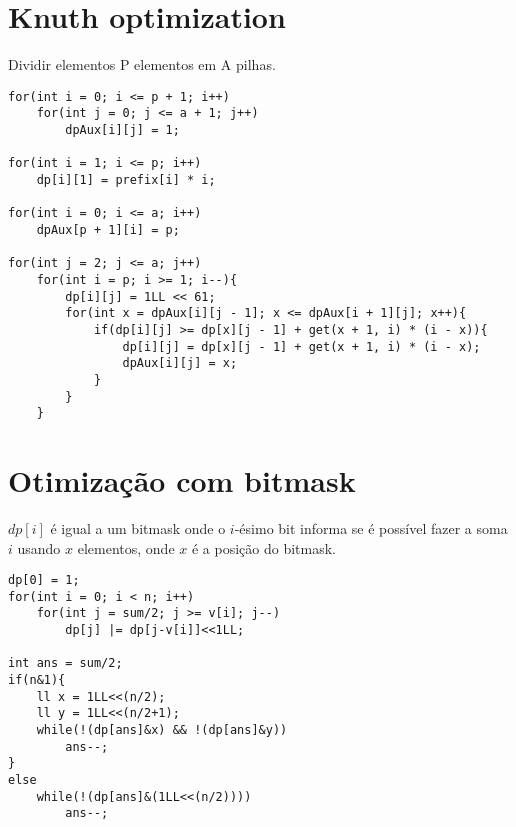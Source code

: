 \section{Knuth optimization}

Dividir elementos P elementos em A pilhas.

\begin{multicols}{2}
\begin{lstlisting}
for(int i = 0; i <= p + 1; i++)
	for(int j = 0; j <= a + 1; j++)
		dpAux[i][j] = 1;
	
for(int i = 1; i <= p; i++)
	dp[i][1] = prefix[i] * i;

for(int i = 0; i <= a; i++)
	dpAux[p + 1][i] = p;

for(int j = 2; j <= a; j++)
	for(int i = p; i >= 1; i--){
		dp[i][j] = 1LL << 61;
		for(int x = dpAux[i][j - 1]; x <= dpAux[i + 1][j]; x++){
			if(dp[i][j] >= dp[x][j - 1] + get(x + 1, i) * (i - x)){
				dp[i][j] = dp[x][j - 1] + get(x + 1, i) * (i - x);
				dpAux[i][j] = x;					
			}
		}
	}

\end{lstlisting}
\end{multicols}

\section{Otimização com bitmask}

$dp[i]$ é igual a um bitmask onde o $i$-ésimo bit informa se é possível fazer a soma $i$ usando $x$ elementos, onde $x$ é a posição do bitmask.

\begin{multicols}{2}
\begin{lstlisting}
dp[0] = 1;
for(int i = 0; i < n; i++)
	for(int j = sum/2; j >= v[i]; j--)
		dp[j] |= dp[j-v[i]]<<1LL;

int ans = sum/2;
if(n&1){
	ll x = 1LL<<(n/2);
	ll y = 1LL<<(n/2+1);
	while(!(dp[ans]&x) && !(dp[ans]&y))
		ans--;
}
else
	while(!(dp[ans]&(1LL<<(n/2))))	
		ans--;
\end{lstlisting}
\end{multicols}

